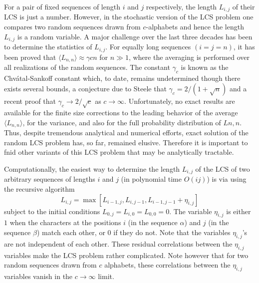 For a pair of fixed sequences of length $i$ and $j$ respectively, the length $L_{i,j}$ of their LCS is just a number. However, in the stochastic version of the LCS problem one compares two random sequences drawn from $c$-alphabets and hence the length $L_{i,j}$ is a random variable. A major challenge over the last three decades has been to determine the statistics of $L_{i,j}$. For equally long sequences $(i = j = n)$, it has been proved that $\langle L_{n,n} \rangle \approx \gamma c n$ for $n \gg 1$, where the averaging is performed over all realizations of the random sequences. The constant $\gamma_c$ is known as the Chvátal-Sankoff constant which, to date, remains undetermined though there exists several bounds, a conjecture due to Steele that $\gamma_c = 2 / (1 + \sqrt{n})$ and a recent proof that $\gamma_c \rightarrow 2 / \sqrt{c} $ as $c \rightarrow \infty$. Unfortunately, no exact results are available for the finite size corrections to the leading behavior of the average $\langle L_{n,n} \rangle$, for the variance, and also for the full probability distribution of $L{n,n}$. Thus, despite tremendous analytical and numerical efforts, exact solution of the random LCS problem has, so far, remained elusive. Therefore it is important to fnid other variants of this LCS problem that may be analytically tractable. 

Computationally, the easiest way to determine the length $L_{i,j}$ of the LCS of two arbitrary sequences of lengths $i$ and $j$ (in polynomial time $O(ij)$) is via using the recursive algorithm
\begin{equation}
	L_{i,j} = \max[L_{i-1,j}, L_{i,j-1}, L_{i-1,j-1}+ \eta_{i,j}] 
\end{equation}
subject to the initial conditions $L_{0,j} = L_{i,0} = L_{0,0} = 0$. The variable $\eta_{i,j}$ is either $1$ when the characters at the positions $i$ (in the sequence $\alpha$) and $j$ (in the sequence $\beta$) match each other, or $0$ if they do not. Note that the variables $\eta_{i,j}$’s are not independent of each other. These residual correlations between the $\eta_{i,j}$ variables make the LCS problem rather complicated. Note however that for two random sequences drawn from $c$ alphabets, these correlations between the $\eta_{i,j}$ variables vanish in the $c \rightarrow \infty$ limit. 

